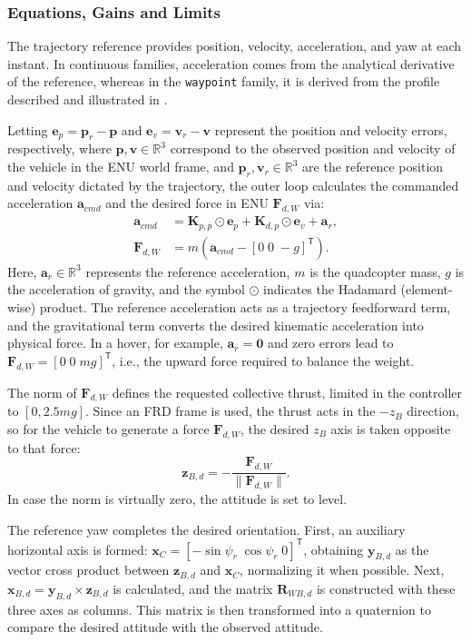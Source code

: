 \subsubsection*{Equations, Gains and Limits}

The trajectory reference provides position, velocity, acceleration, and yaw at each instant. In continuous families, acceleration comes from the analytical derivative of the reference, whereas in the \texttt{waypoint} family, it is derived from the profile described and illustrated in .

Letting $\bm{e}_p=\bm{p}_r-\bm{p}$ and $\bm{e}_v=\bm{v}_r-\bm{v}$ represent the position and velocity errors, respectively, where $\bm{p}, \bm{v} \in \mathbb{R}^3$ correspond to the observed position and velocity of the vehicle in the ENU world frame, and $\bm{p}_r, \bm{v}_r \in \mathbb{R}^3$ are the reference position and velocity dictated by the trajectory, the outer loop calculates the commanded acceleration $\bm{a}_{cmd}$ and the desired force in ENU $\bm{F}_{d,W}$ via:
\begin{align}
 \bm{a}_{cmd} &=
 \bm{K}_{p,p}\odot\bm{e}_p+
 \bm{K}_{d,p}\odot\bm{e}_v+\bm{a}_r,\\
 \bm{F}_{d,W} &=
 m\left(\bm{a}_{cmd}-[0\;0\;-g]^\mathsf{T}\right).
 \label{eq:pd-fuerza-deseada}
\end{align}
Here, $\bm{a}_r \in \mathbb{R}^3$ represents the reference acceleration, $m$ is the quadcopter mass, $g$ is the acceleration of gravity, and the symbol $\odot$ indicates the Hadamard (element-wise) product. The reference acceleration acts as a trajectory feedforward term, and the gravitational term converts the desired kinematic acceleration into physical force. In a hover, for example, $\bm{a}_r=\bm{0}$ and zero errors lead to $\bm{F}_{d,W}=[0\;0\;mg]^\mathsf{T}$, i.e., the upward force required to balance the weight.

The norm of $\bm{F}_{d,W}$ defines the requested collective thrust, limited in the controller to $[0, 2.5mg]$. Since an FRD frame is used, the thrust acts in the $-z_B$ direction, so for the vehicle to generate a force $\bm{F}_{d,W}$, the desired $z_B$ axis is taken opposite to that force:
\[
 \bm{z}_{B,d}=-\frac{\bm{F}_{d,W}}{\|\bm{F}_{d,W}\|}.
\]
In case the norm is virtually zero, the attitude is set to level.

The reference yaw completes the desired orientation. First, an auxiliary horizontal axis is formed: $\bm{x}_C=[-\sin\psi_r\;\cos\psi_r\;0]^\mathsf{T}$, obtaining $\bm{y}_{B,d}$ as the vector cross product between $\bm{z}_{B,d}$ and $\bm{x}_C$, normalizing it when possible. Next, $\bm{x}_{B,d}=\bm{y}_{B,d}\times\bm{z}_{B,d}$ is calculated, and the matrix $\bm{R}_{WB,d}$ is constructed with these three axes as columns. This matrix is then transformed into a quaternion to compare the desired attitude with the observed attitude.

